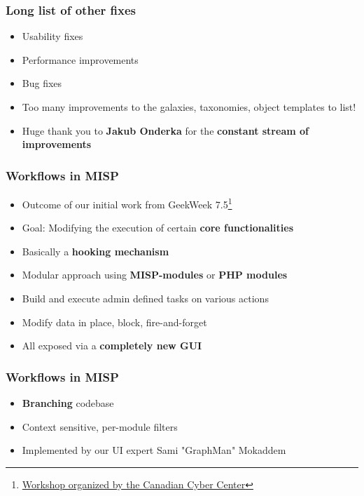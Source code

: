 \begin{frame}
  \frametitle{Long list of other fixes}
  \begin{itemize}
     \item Usability fixes
     \item Performance improvements
     \item Bug fixes
     \item Too many improvements to the galaxies, taxonomies, object templates to list!
     \item Huge thank you to {\bf Jakub Onderka} for the {\bf constant stream of improvements}
  \end{itemize}
\end{frame}

\begin{frame}
  \frametitle{Workflows in MISP}
  \begin{itemize}
     \item Outcome of our initial work from GeekWeek 7.5\footnote{\href{https://cyber.gc.ca/en/events/geekweek-75}{Workshop organized by the Canadian Cyber Center}}
     \item Goal: Modifying the execution of certain {\bf core functionalities}
     \item Basically a {\bf hooking mechanism}
     \item Modular approach using {\bf MISP-modules} or {\bf PHP modules}
     \item Build and execute admin defined tasks on various actions
     \item Modify data in place, block, fire-and-forget
     \item All exposed via a {\bf completely new GUI}
  \end{itemize}
\end{frame}

\begin{frame}
  \frametitle{Workflows in MISP}
  \begin{itemize}
     \item {\bf Branching} codebase
     \item Context sensitive, per-module filters
     \item Implemented by our UI expert Sami "GraphMan" Mokaddem 
  \end{itemize}
\end{frame}


